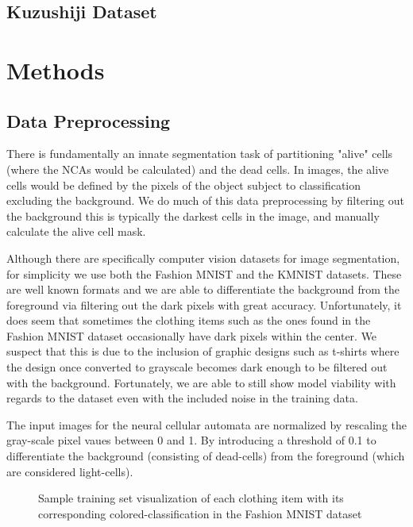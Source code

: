 \documentclass[conference]{IEEEtran}
\begin{document}
\subsection{Kuzushiji Dataset}


\section{Methods}

\subsection{Data Preprocessing}

There is fundamentally an innate segmentation task of partitioning "alive" cells (where the NCAs would be calculated) and the dead cells. In images, the alive cells would be defined by the pixels of the object subject to classification excluding the background. We do much of this data preprocessing by filtering out the background this is typically the darkest cells in the image, and manually calculate the alive cell mask.

Although there are specifically computer vision datasets for image segmentation, for simplicity we use both the Fashion MNIST and the KMNIST datasets. These are well known formats and we are able to differentiate the background from the foreground via filtering out the dark pixels with great accuracy. Unfortunately, it does seem that sometimes the clothing items such as the ones found in the Fashion MNIST dataset occasionally have dark pixels within the center. We suspect that this is due to the inclusion of graphic designs such as t-shirts where the design once converted to grayscale becomes dark enough to be filtered out with the background. Fortunately, we are able to still show model viability with regards to the dataset even with the included noise in the training data. 
 
The input images for the neural cellular automata are normalized by rescaling the gray-scale pixel vaues between 0 and 1. By introducing a threshold of 0.1 to differentiate the background (consisting of dead-cells) from the foreground (which are considered light-cells). 

\begin{figure}[htbp]
\caption{Sample training set visualization of each clothing item with its corresponding colored-classification in the Fashion MNIST dataset }
\end{figure}
\end{document}
